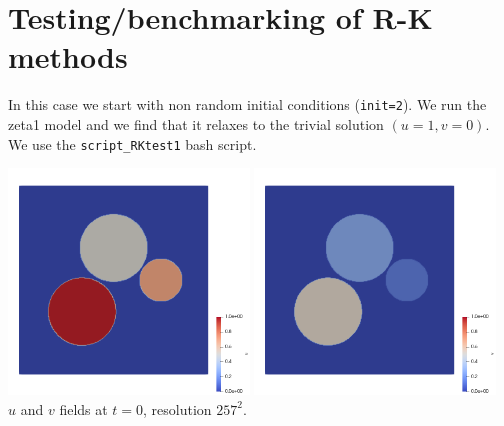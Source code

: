 \newpage
\section*{Testing/benchmarking of R-K methods}

In this case we start with non random initial conditions (\lstinline{init=2}).
We run the zeta1 model and we find that it relaxes to the trivial solution $(u=1,v=0)$.
We use the {\tt script\_RKtest1} bash script.

\begin{center}
\includegraphics[height=6cm]{python_codes/fieldstone_171/RKtest1/u0}
\includegraphics[height=6cm]{python_codes/fieldstone_171/RKtest1/v0}\\
{\captionfont $u$ and $v$ fields at $t=0$, resolution $257^2$.}
\end{center}

